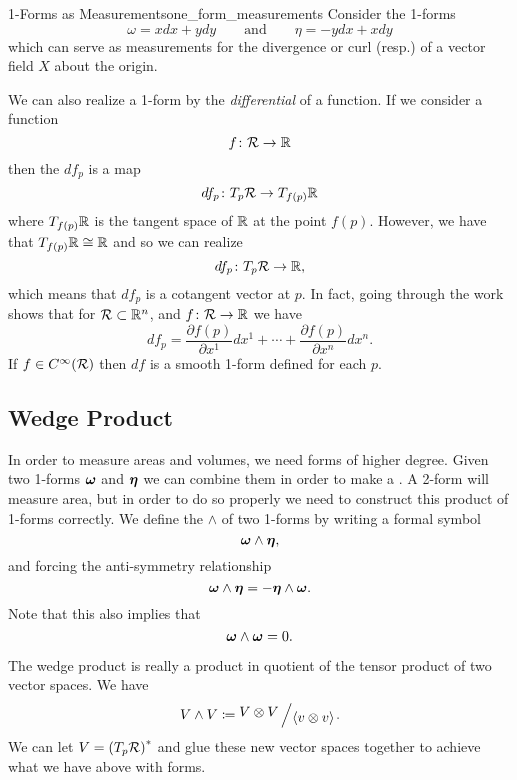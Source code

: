         \begin{ex}{1-Forms as Measurements}{one_form_measurements}
        Consider the 1-forms 
        \[
        \omega = xdx + y dy \qquad \textrm{and} \qquad \eta = -ydx + xdy
        \]
        which can serve as measurements for the divergence or curl (resp.) of a vector field $X$ about the origin.  
        \end{ex}
        
        We can also realize a 1-form by the \emph{differential} of a function.  If we consider a function
        \[
        f\colon \mathcal{R} \to \mathbb{R}
        \]
        then the  $df_p$ is a map
        \[
        df_p \colon T_p\mathcal{R} \to T_{f(p)}\mathbb{R}
        \]
        where $T_{f(p)}\mathbb{R}$ is the tangent space of $\mathbb{R}$ at the point $f(p)$. However, we have that $T_{f(p)}\mathbb{R}\cong \mathbb{R}$ and so we can realize 
        \[
        df_{p} \colon T_p\mathcal{R} \to \mathbb{R},
        \]
        which means that $df_p$ is a cotangent vector at $p$.  In fact, going through the work shows that for $\mathcal{R} \subset \mathbb{R}^n$, and $f\colon \mathcal{R} \to \mathbb{R}$ we have
        \[
        df_p = \frac{\partial f(p)}{\partial x^1}dx^1 + \cdots + \frac{\partial f(p)}{\partial x^n}dx^n.
        \]
        If $f \in C^\infty(\mathcal{R})$ then $df$ is a smooth 1-form defined for each $p$.

\subsection{Wedge Product}

In order to measure areas and volumes, we need forms of higher degree. Given two 1-forms $\boldsymbol{\omega}$ and $\boldsymbol{\eta}$ we can combine them in order to make a .  A 2-form will measure area, but in order to do so properly we need to construct this product of 1-forms correctly.  We define the  $\wedge$ of two 1-forms by writing a formal symbol
\[
\boldsymbol{\omega} \wedge \boldsymbol{\eta},
\]
and forcing the anti-symmetry relationship
\[
\boldsymbol{\omega} \wedge \boldsymbol{\eta} = - \boldsymbol{\eta} \wedge \boldsymbol{\omega}.
\]
Note that this also implies that
\[
\boldsymbol{\omega} \wedge \boldsymbol{\omega} = 0.
\]

\begin{remark}
The wedge product is really a product in quotient of the tensor product of two vector spaces.  We have
\[
V \wedge V \coloneqq \bigslant{V\otimes V}{\langle v\otimes v \rangle}.
\]
We can let $V=\left(T_p\mathcal{R}\right)^*$ and glue these new vector spaces together to achieve what we have above with forms.
\end{remark}


